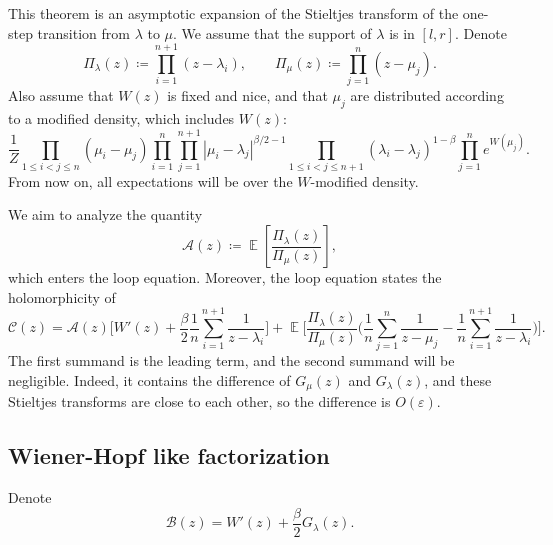 \documentclass[letterpaper,11pt,oneside,reqno]{article}
\numberwithin{equation}{section}
\theoremstyle{definition}
\begin{document}
This theorem is an asymptotic expansion of the Stieltjes transform
of the one-step transition from $\lambda$ to $\mu$.
We assume that the support of $\lambda$ is in $[l,r]$.
Denote 
\begin{equation*}
	\Pi_\lambda(z)\coloneqq \prod_{i=1}^{n+1}(z-\lambda_i),\qquad 
	\Pi_\mu(z)\coloneqq \prod_{j=1}^{n}(z-\mu_j).
\end{equation*}
Also assume that $W(z)$ is fixed and nice, and that $\mu_j$ are 
distributed according to a modified 
density, which includes $W(z)$:
\begin{equation*}
	\frac{1}{Z}
		\prod_{1\le i<j\le n}(\mu_i-\mu_j)
		\prod_{i=1}^{n}\prod_{j=1}^{n+1} |\mu_i-\lambda_j|^{\beta/2-1}
		\prod_{1\le i<j\le n+1}(\lambda_i-\lambda_j)^{1-\beta}\prod_{j=1}^n e^{W(\mu_j)}.
\end{equation*}
From now on, all expectations will be over the $W$-modified density.

We aim to analyze the quantity
\begin{equation*}
	\mathcal{A}(z)\coloneqq\operatorname{\mathbb{E}}\left[ \frac{\Pi_\lambda(z)}{\Pi_\mu(z)} \right],
\end{equation*}
which enters the loop equation. Moreover, the loop equation
states the holomorphicity of
\begin{equation*}
	\mathcal{C}(z)=
	\mathcal{A}(z)\Biggl[ W'(z)+ \frac{\beta}{2}\frac{1}{n}\sum_{i=1}^{n+1}\frac{1}{z-\lambda_i} \Biggr]+
	\operatorname{\mathbb{E}}
	\Biggl[ 
		\frac{\Pi_\lambda(z)}{\Pi_\mu(z)}\Biggl(\frac{1}{n}\sum_{j=1}^{n}\frac{1}{z-\mu_j}-
		\frac{1}{n}\sum_{i=1}^{n+1}\frac{1}{z-\lambda_i}\Biggr)
	\Biggr].
\end{equation*}
The first summand is the leading term, and the second summand will be 
negligible. Indeed, it contains the difference of $G_\mu(z)$ and $G_\lambda(z)$, 
and these Stieltjes transforms are close to each other, so the difference is $O(\varepsilon)$.

\subsection{Wiener-Hopf like factorization}

Denote
\begin{equation*}
	\mathcal{B}(z)=W'(z)+\frac{\beta}{2}G_\lambda(z).
\end{equation*}
\end{document}
